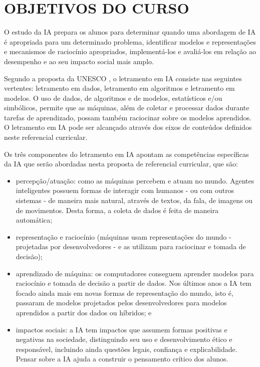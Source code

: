 \chapter{OBJETIVOS DO CURSO}
\label{cap:objetivos-do-curso}


O estudo da IA prepara os alunos para determinar quando uma abordagem de IA é apropriada para um determinado problema, identificar modelos e representações e mecanismos de raciocínio apropriados, implementá-los e avaliá-los em relação ao desempenho e ao seu impacto social mais amplo.   

Segundo a proposta da  UNESCO \cite{unesco2024ai}, o letramento em IA consiste nas seguintes vertentes: letramento em dados, letramento em algoritmos e letramento em modelos.  O uso de dados, de algoritmos e de modelos, estatísticos e/ou simbólicos, permite que as máquinas, além de coletar e processar dados durante tarefas de aprendizado, possam também raciocinar sobre os modelos aprendidos. O letramento em IA pode ser alcançado através dos eixos de conteúdos definidos neste referencial curricular.

Os três componentes do letramento em IA apontam as competências específicas da IA que serão abordadas nesta proposta de referencial curricular, que são: 

\begin{itemize}
    \item percepção/atuação: como as máquinas percebem e atuam no mundo. Agentes inteligentes possuem formas de interagir com humanos - ou com outros sistemas - de maneira mais natural, através de textos, da fala, de imagens ou de movimentos. Desta forma, a coleta de dados é feita de maneira automática; 
    \item representação e raciocínio (máquinas usam representações do mundo - projetadas por desenvolvedores - e as utilizam para raciocinar e tomada de decisão); 
    \item aprendizado de máquina: os computadores conseguem aprender modelos para raciocínio e tomada de decisão a partir de dados. Nos últimos anos a IA tem focado ainda mais em novas formas de representação do mundo, isto é, passaram de modelos projetados pelos desenvolvedores para modelos aprendidos a partir dos dados ou híbridos; e
    \item impactos sociais: a IA tem impactos que assumem formas positivas e negativas na sociedade, distinguindo seu uso e desenvolvimento ético e responsável, incluindo ainda questões legais, confiança e explicabilidade. Pensar sobre a IA ajuda a construir o pensamento crítico dos alunos.   
\end{itemize}

